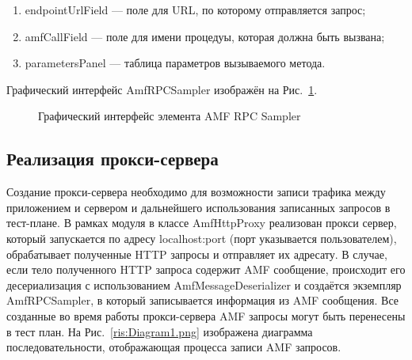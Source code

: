 \begin{enumerate}
\item endpointUrlField --- поле для URL, по которому отправляется запрос;
\item amfCallField --- поле для имени процедуы, которая должна быть вызвана; 
\item parametersPanel --- таблица параметров вызываемого метода.
\end{enumerate}

Графический интерфейс AmfRPCSampler изображён на Рис.~\ref{ris:amfSampler1.png}.

\begin{figure}[ht]
\caption{Графический интерфейс элемента AMF RPC Sampler}
\label{ris:amfSampler1.png}
\end{figure}

\subsection{Реализация прокси-сервера}

Создание прокси-сервера необходимо для возможности записи трафика между приложением и сервером и дальнейшего использования 
записанных запросов в тест-плане. В рамках модуля в классе AmfHttpProxy реализован прокси сервер, который запускается по адресу
localhost:port (порт указывается пользователем), обрабатывает полученные HTTP запросы и отправляет их адресату.
В случае, если тело полученного HTTP запроса содержит AMF сообщение, происходит его десериализация с использованием
AmfMessageDeserializer и создаётся экземпляр 
AmfRPCSampler, в который записывается информация из AMF сообщения. Все созданные во время работы прокси-сервера AMF запросы 
могут быть перенесены в тест план. На Рис.~\ref{ris:Diagram1.png} изображена диаграмма последовательности, отображающая
процесса записи AMF запросов.

